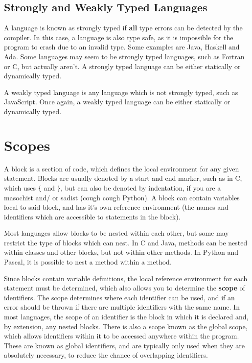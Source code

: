 \subsection*{Strongly and Weakly Typed Languages}

A language is known as strongly typed if \textbf{all} type errors can be detected by the compiler. In this case, a
 language is also type safe, as it is impossible for the program to crash due to an invalid type. Some examples are
 Java, Haskell and Ada. Some languages may seem to be strongly typed languages, such as Fortran or C, but actually aren't.
 A strongly typed language can be either statically or dynamically typed.

A weakly typed language is any language which is not strongly typed, such as JavaScript. Once again, a weakly typed
 language can be either statically or dynamically typed.

\section*{Scopes}

A block is a section of code, which defines the local environment for any given statement. Blocks are usually denoted by
 a start and end marker, such as in C, which uses \verb`{` and \verb`}`, but can also be denoted by indentation, if you
 are a masochist and/ or sadist (cough cough Python). A block can contain variables local to said block, and has it's
 own reference environment (the names and identifiers which are accessible to statements in the block).

Most languages allow blocks to be nested within each other, but some may restrict the type of blocks which can nest. In
 C and Java, methods can be nested within classes and other blocks, but not within other methods. In Python and Pascal,
 it is possible to nest a method within a method.

Since blocks contain variable definitions, the local reference environment for each statement must be determined, which
 also allows you to determine the \textbf{scope} of identifiers. The scope determines where each identifier can be used,
 and if an error should be thrown if there are multiple identifiers with the same name. In most languages, the scope of
 an identifier is the block in which it is declared and, by extension, any nested blocks. There is also a scope known as
 the global scope, which allows identifiers within it to be accessed anywhere within the program. These are known as
 global identifiers, and are typically only used when they are absolutely necessary, to reduce the chance of overlapping
 identifiers.

